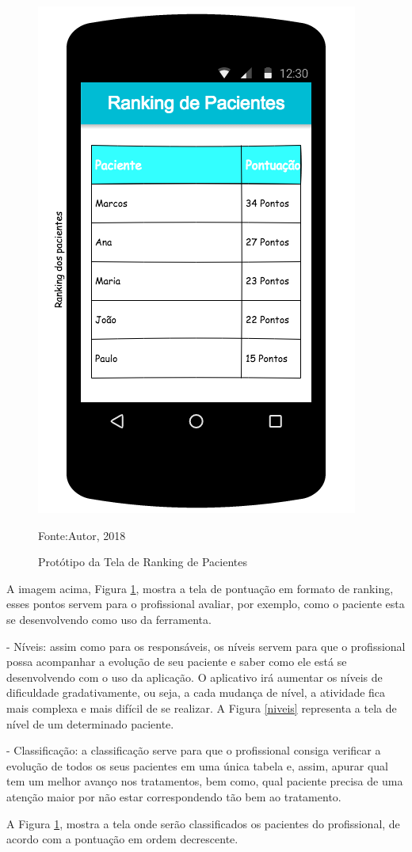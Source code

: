\begin{itemize}
		\begin{figure}[H]
			\centering
			\includegraphics[scale=0.6]{img/rankingpaciente.png}
			\caption{Protótipo da Tela de Ranking de Pacientes}
			Fonte:Autor, 2018
			\label{ranking}
		\end{figure}
		
		A imagem acima, Figura \ref{ranking}, mostra a tela de pontuação em formato de ranking,  esses pontos servem para o profissional avaliar, por exemplo, como o paciente esta se desenvolvendo como uso da ferramenta.
		
		 - Níveis: assim como para os responsáveis, os níveis servem para que o profissional possa acompanhar a evolução de seu paciente e saber como ele está se desenvolvendo com o uso da aplicação. O aplicativo irá aumentar os níveis de dificuldade gradativamente, ou seja, a cada mudança de nível, a atividade fica mais complexa e mais difícil de se realizar.  A Figura \ref{niveis} representa a tela de nível de um determinado paciente.
		
		
		 - Classificação: a classificação serve para que o profissional consiga verificar a evolução de todos os seus pacientes em uma única tabela e, assim, apurar qual tem um melhor avanço nos tratamentos, bem como, qual paciente precisa de uma atenção maior por não estar correspondendo tão bem ao tratamento.
	
     	A Figura \ref{ranking}, mostra a tela onde serão classificados os pacientes do profissional, de acordo com a pontuação em ordem decrescente.
\end{itemize}


